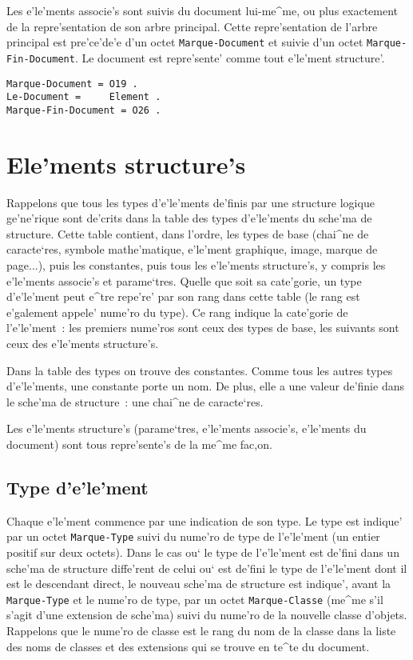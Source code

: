 Les e'le'ments associe's sont suivis du document lui-me^me, ou plus exactement
de la repre'sentation de son arbre principal. Cette repre'sentation de l'arbre
principal est pre'ce'de'e d'un octet {\tt Marque-Document} et suivie d'un octet
{\tt Marque-Fin-Document}. Le document est repre'sente' comme tout e'le'ment
structure'.

\begin{verbatim}
Marque-Document = O19 .
Le-Document =     Element .
Marque-Fin-Document = O26 .
\end{verbatim}

\section{Ele'ments structure's}
\label{elstruct}

Rappelons que tous les types d'e'le'ments de'finis par une structure logique
ge'ne'rique sont de'crits dans la table des types d'e'le'ments du sche'ma de
structure. Cette table contient, dans l'ordre, les types de base (chai^ne de
caracte`res, symbole mathe'matique, e'le'ment graphique, image, marque de
page...), puis les constantes, puis tous les e'le'ments structure's, y compris
les e'le'ments associe's et parame`tres. Quelle que soit sa cate'gorie, un type
d'e'le'ment peut e^tre repe're' par son rang dans cette table (le rang  est
e'galement appele' nume'ro du type). Ce rang indique la cate'gorie de l'e'le'ment~:
les premiers nume'ros sont ceux des types de base, les suivants sont ceux
des e'le'ments structure's.

Dans la table des types on trouve des constantes. Comme tous les autres types
d'e'le'ments, une constante porte un nom. De plus, elle a une valeur de'finie
dans le sche'ma de structure~: une chai^ne de caracte`res.

Les e'le'ments structure's (parame`tres, e'le'ments associe's, e'le'ments du
document) sont tous repre'sente's de la me^me fac,on.

\subsection{Type d'e'le'ment}

Chaque e'le'ment commence par une indication de son type. Le type est indique'
par un octet {\tt Marque-Type} suivi du nume'ro de type de l'e'le'ment
(un entier positif sur deux octets).
Dans le cas ou` le type de l'e'le'ment est de'fini dans un sche'ma de structure
diffe'rent de celui ou` est de'fini le type de l'e'le'ment dont il est le
descendant direct, le nouveau sche'ma de structure est indique', avant
la {\tt Marque-Type} et le nume'ro de type, par un octet {\tt Marque-Classe}
(me^me s'il s'agit d'une extension de sche'ma)
suivi du nume'ro de la nouvelle classe d'objets. Rappelons que le nume'ro de
classe est le rang du nom de la classe dans la liste des noms de classes et
des extensions qui se trouve en te^te du document.

